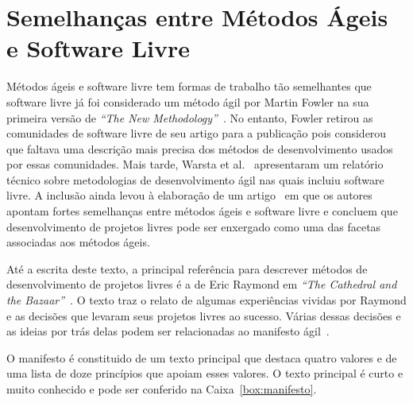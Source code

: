 \chapter{Semelhanças entre Métodos Ágeis e Software Livre}
\label{cap:semelhancas}

Métodos ágeis e software livre tem formas de trabalho tão semelhantes
que software livre já foi considerado um método ágil por Martin Fowler
na sua primeira versão de \emph{``The New
  Methodology''}~\cite{Fowler00orig}. No entanto, Fowler retirou as
comunidades de software livre de seu artigo para a publicação pois
considerou que faltava uma descrição mais precisa dos métodos de
desenvolvimento usados por essas comunidades. Mais tarde, Warsta et
al.~\cite{Warsta2002} apresentaram um relatório técnico sobre
metodologias de desenvolvimento ágil nas quais incluiu software
livre. A inclusão ainda levou à elaboração de um
artigo~\cite{Warsta2003} em que os autores apontam fortes semelhanças
entre métodos ágeis e software livre e concluem que desenvolvimento de
projetos livres pode ser enxergado como uma das facetas associadas aos
métodos ágeis.

Até a escrita deste texto, a principal referência para descrever
métodos de desenvolvimento de projetos livres é a de Eric Raymond em
\emph{``The Cathedral and the Bazaar''}~\cite{Raymond1999}. O texto
traz o relato de algumas experiências vividas por Raymond e as
decisões que levaram seus projetos livres ao sucesso. Várias dessas
decisões e as ideias por trás delas podem ser relacionadas ao
manifesto ágil~\cite{AgileManifesto}.

O manifesto é constituido de um texto principal que destaca quatro
valores e de uma lista de doze princípios que apoiam esses valores. O
texto principal é curto e muito conhecido e pode ser conferido na
Caixa~\ref{box:manifesto}.


